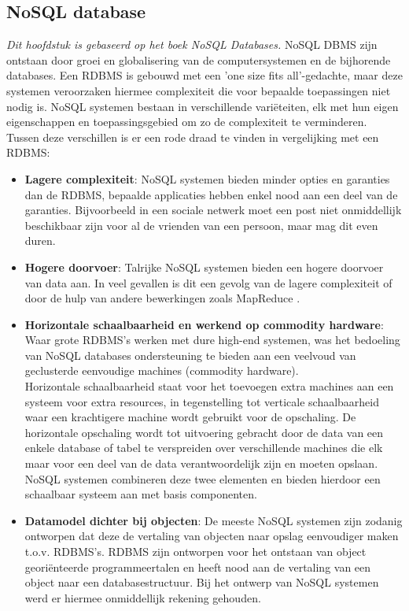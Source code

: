 \subsection{NoSQL database}\label{sec:eventualconsistency}
\textit{Dit hoofdstuk is gebaseerd op het boek NoSQL Databases\cite{Strauch.NoSQL}.}\newline
NoSQL DBMS zijn ontstaan door groei en globalisering van de computersystemen en de bijhorende databases. Een RDBMS is gebouwd met een 'one size fits all'-gedachte, maar deze systemen veroorzaken hiermee complexiteit die voor bepaalde toepassingen niet nodig is. NoSQL systemen bestaan in verschillende variëteiten, elk met hun eigen eigenschappen en toepassingsgebied om zo de complexiteit te verminderen. Tussen deze verschillen is er een rode draad te vinden in vergelijking met een RDBMS:
\begin{itemize}
	\item \textbf{Lagere complexiteit}: NoSQL systemen bieden minder opties en garanties dan de RDBMS, bepaalde applicaties hebben enkel nood aan een deel van de garanties. Bijvoorbeeld in een sociale netwerk moet een post niet onmiddellijk beschikbaar zijn voor al de vrienden van een persoon, maar mag dit even duren.
	\item \textbf{Hogere doorvoer}: Talrijke NoSQL systemen bieden een hogere doorvoer van data aan. In veel gevallen is dit een gevolg van de lagere complexiteit of door de hulp van andere bewerkingen zoals MapReduce \cite{dean2008mapreduce}.
	
	\item \textbf{Horizontale schaalbaarheid en werkend op commodity hardware}: Waar grote RDBMS's werken met dure high-end systemen, was het bedoeling van NoSQL databases ondersteuning te bieden aan een veelvoud van geclusterde eenvoudige machines (commodity hardware). \\
	Horizontale schaalbaarheid staat voor het toevoegen extra machines aan een systeem voor extra resources, in tegenstelling tot verticale schaalbaarheid waar een krachtigere machine wordt gebruikt voor de opschaling. De horizontale opschaling wordt tot uitvoering gebracht door de data van een enkele database of tabel te verspreiden over verschillende machines die elk maar voor een deel van de data verantwoordelijk zijn en moeten opslaan.\\
	NoSQL systemen combineren deze twee elementen en bieden hierdoor een schaalbaar systeem aan met basis componenten.
	\item \textbf{Datamodel dichter bij objecten}: De meeste NoSQL systemen zijn zodanig ontworpen dat deze de vertaling van objecten naar opslag eenvoudiger maken t.o.v. RDBMS's. RDBMS zijn ontworpen voor het ontstaan van object georiënteerde programmeertalen en heeft nood aan de vertaling van een object naar een databasestructuur. Bij het ontwerp van NoSQL systemen werd er hiermee onmiddellijk rekening gehouden.  
\end{itemize}  \noindent
